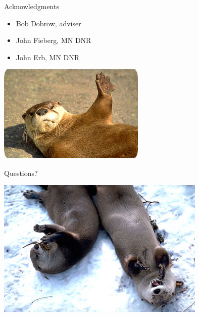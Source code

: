 \documentclass{beamer}
\begin{document}
\begin{frame}{Acknowledgments}
	\begin{itemize}
		\item Bob Dobrow, adviser
		\item John Fieberg, MN DNR
		\item John Erb, MN DNR
	\end{itemize}
	\begin{center}
		\includegraphics[width=7cm]{Figures/Pictures/cuteOtter10.jpg}
	\end{center}
\end{frame}

\begin{frame}{Questions?}
	\begin{center}
		\includegraphics[width=10cm]{Figures/Pictures/cuteOtter7.jpg}
	\end{center}
\end{frame}
\end{document}
